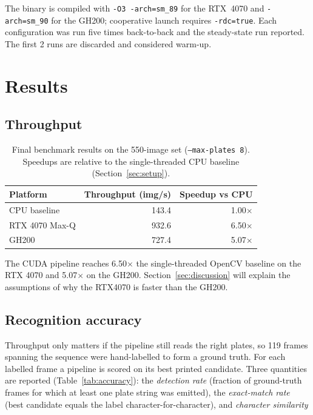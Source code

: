 The binary is compiled with \texttt{-O3 -arch=sm\_89} for the RTX~4070 and \texttt{-arch=sm\_90} for the GH200; cooperative launch requires \texttt{-rdc=true}.
Each configuration was run five times back-to-back and the steady-state run reported.
The first 2 runs are discarded and considered warm-up.

\section{Results}
\label{sec:results}

\subsection{Throughput}

\begin{table}[H]
\centering
\begin{tabular}{lrr}
\toprule
Platform & Throughput (img/s) & Speedup vs CPU \\
\midrule
CPU baseline   & 143.4 & 1.00$\times$ \\
RTX 4070 Max-Q & 932.6 & 6.50$\times$ \\
GH200          & 727.4 & 5.07$\times$ \\
\bottomrule
\end{tabular}
\caption{Final benchmark results on the 550-image set (\texttt{--max-plates 8}). Speedups are relative to the single-threaded CPU baseline (Section~\ref{sec:setup}).}
\label{tab:crossplatform}
\end{table}

The CUDA pipeline reaches 6.50$\times$ the single-threaded OpenCV baseline on the RTX 4070 and 5.07$\times$ on the GH200.
Section~\ref{sec:discussion} will explain the assumptions of why the RTX4070 is faster than the GH200.

\subsection{Recognition accuracy}
\label{sec:accuracy}

Throughput only matters if the pipeline still reads the right plates, so 119 frames spanning the sequence were hand-labelled to form a ground truth.
For each labelled frame a pipeline is scored on its best printed candidate.
Three quantities are reported (Table~\ref{tab:accuracy}): the \emph{detection rate} (fraction of ground-truth frames for which at least one plate string was emitted), the \emph{exact-match rate} (best candidate equals the label character-for-character), and \emph{character similarity}

